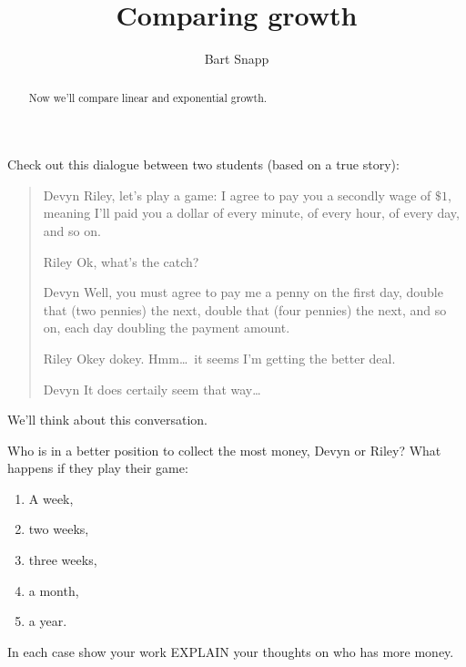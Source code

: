 \documentclass[nooutcomes,noauthor,hints]{ximera}
\title{Comparing growth}
\author{Bart Snapp}
\begin{document}
\begin{abstract}
  Now we'll compare linear and exponential growth.
\end{abstract}
\maketitle

\begin{listOutcomes}
\item 
\end{listOutcomes}
Check out this dialogue between two students (based on a true story):

\begin{mdframed}[style=OutcomeStyle]
  \begin{quote}
\begin{dialogue}
\item[Devyn] Riley, let's play a game: I agree to pay you a secondly
  wage of $\$1$, meaning I'll paid you a dollar  of
  every minute, of every hour, of every day, and so on.
\item[Riley] Ok, what's the catch? 
\item[Devyn] Well, you must agree to pay me a penny on the first day,
  double that (two pennies) the next, double that (four pennies) the
  next, and so on, each day doubling the payment amount.
\item[Riley] Okey dokey. Hmm\dots\ it seems I'm getting the better deal. 
\item[Devyn] It does certaily seem that way\dots
\end{dialogue}
  \end{quote}
\end{mdframed}
We'll think about this conversation.




\mynewpage


\begin{question}
 Who is in a better position to collect the most money, Devyn or
 Riley? What happens if they play their game:
 \begin{enumerate}
 \item A week,
 \item two weeks,
 \item three weeks,
 \item a month,
 \item a year.
 \end{enumerate}
 In each case show your work EXPLAIN your thoughts on who has more money.
 \end{question}
 
\end{document}
